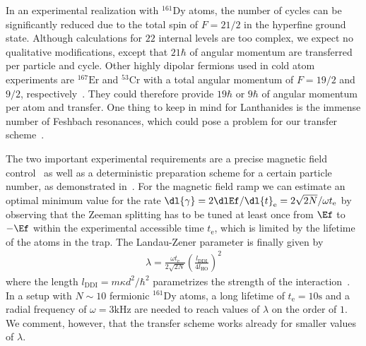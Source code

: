 In an experimental realization with $^{161}\text{Dy}$ atoms, the number of cycles can be significantly reduced due to the total spin of $F=21/2$ in the hyperfine ground state. Although calculations for $22$ internal levels are too complex, we expect no qualitative modifications, except that $21\hbar$ of angular momentum are transferred per particle and cycle. Other highly dipolar fermions used in cold atom experiments are $^{167}\text{Er}$ and $^{53}\text{Cr}$ with a total angular momentum of $F=19/2$ and $9/2$, respectively~\cite{Berglund2007,Chicireanu2006}. They could therefore provide $19\hbar$ or $9\hbar$ of angular momentum per atom and transfer. One thing to keep in mind for Lanthanides is the immense number of Feshbach resonances, which could pose a problem for our transfer scheme~\cite{Frisch2014}.

The two important experimental requirements are a precise magnetic field control~\cite{Pasquiou2011} as well as a deterministic preparation scheme for a certain particle number, as demonstrated in~\cite{Serwane2011}. For the magnetic field ramp we can estimate an optimal minimum value for the rate $\dl{\gamma}=2\dlEf/\dl{t}_\text{e}=2\sqrt{2N}/\omega t_\text{e}$ by observing that the Zeeman splitting has to be tuned at least once from $\Ef$ to $-\Ef$ within the experimental accessible time $t_\text{e}$, which is limited by the lifetime of the atoms in the trap. The Landau-Zener parameter is finally given by
\begin{align}
\lambda = \frac{\omega t_\text{e}}{2\sqrt{2N}} \left(\frac{l_\text{DDI}}{4 l_\text{HO}}\right)^2
\end{align}
where the length $l_\text{DDI} = m\kappa d^2/\hbar^2$ parametrizes the strength of the interaction~\cite{Lu2012}. In a setup with $N\sim 10$ fermionic $^{161}\text{Dy}$ atoms, a long lifetime of $t_\text{e}=10\text{s}$ and a radial frequency of $\omega = 3\text{kHz}$ are needed to reach values of $\lambda$ on the order of $1$. We comment, however, that the transfer scheme works already for smaller values of $\lambda$.


